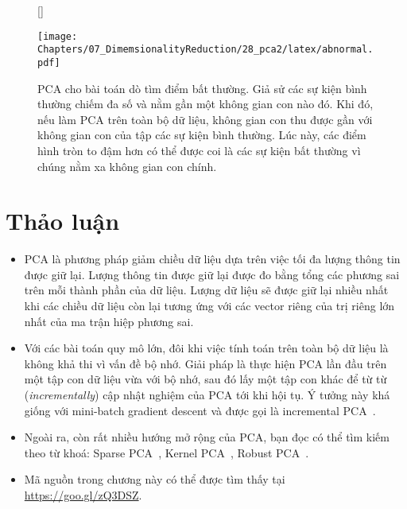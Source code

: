 \begin{figure}[t]
   
    [\FBwidth]
    {\caption{ PCA cho bài toán dò tìm điểm bất thường. Giả sử
    các sự kiện {bình thường} chiếm đa số và nằm gần  một không
    gian con nào đó. Khi đó, nếu làm PCA trên toàn bộ dữ liệu, không gian con
    thu được gần với không gian con của tập các sự kiện {bình thường}.
    Lúc này, các
    điểm hình tròn to đậm hơn có thể được coi là các sự kiện {bất thường} vì chúng nằm xa không gian con chính.} 
    \label{fig:28_4}}
    { %
    \texttt{[image: Chapters/07\_DimemsionalityReduction/28\_pca2/latex/abnormal.pdf]}
    }
\end{figure}

 
\section{Thảo luận}
\begin{itemize}
\item PCA là phương pháp giảm chiều dữ liệu dựa trên việc tối đa lượng
thông tin được giữ lại. Lượng thông tin được giữ lại được đo bằng tổng các
phương sai trên mỗi thành phần của dữ liệu. Lượng dữ liệu sẽ được giữ lại nhiều
nhất khi các chiều dữ liệu còn lại tương ứng với các vector riêng của trị riêng
lớn nhất của ma trận hiệp phương sai.

\item Với các bài toán quy mô lớn, đôi khi việc tính toán trên toàn bộ dữ liệu
là không khả thi vì vấn đề bộ nhớ. Giải pháp là thực hiện PCA lần đầu
trên một tập con dữ liệu vừa với bộ nhớ, sau đó lấy một tập con khác để {từ từ} (\textit{incrementally}) cập nhật nghiệm của PCA tới khi hội
tụ. Ý tưởng này khá giống với mini-batch gradient descent và được gọi là
incremental PCA~\cite{zhao2006novel}.
 
\item Ngoài ra, còn rất nhiều hướng mở rộng của PCA, bạn đọc có thể tìm kiếm
theo từ khoá: Sparse PCA~\cite{d2005direct}, Kernel PCA~\cite{mika1999kernel},
Robust PCA~\cite{candes2011robust}. 

\item Mã nguồn trong chương này có thể được tìm thấy tại
\url{https://goo.gl/zQ3DSZ}. 
\end{itemize}
 